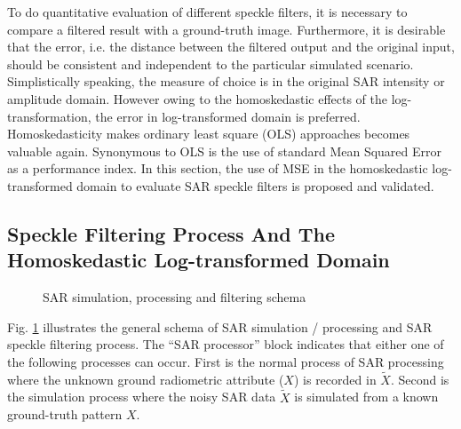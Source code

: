 To do quantitative evaluation of different speckle filters, it is necessary to compare a filtered result with a ground-truth image. 
Furthermore, it is desirable that the error, i.e. the distance between the filtered output and the original input, should be consistent and independent to the particular simulated scenario. 
Simplistically speaking, the measure of choice is in the original SAR intensity or amplitude domain. 
However owing to the homoskedastic effects of the log-transformation, the error in log-transformed domain is preferred.
Homoskedasticity makes ordinary least square (OLS) approaches becomes valuable again. 
Synonymous to OLS is the use of standard Mean Squared Error as a performance index.
In this section, the use of MSE in the homoskedastic log-transformed domain to evaluate SAR speckle filters is proposed and validated.


\subsection{ Speckle Filtering Process And The Homoskedastic Log-transformed Domain}
\label{sec:schema_log_images}

\begin{figure}[h]
 \centering
 \epsfxsize=2.4in
 \epsfysize=1.2in
\caption{SAR simulation, processing and filtering schema}
\label{fig:simul_process_filter_schema}
\end{figure}

Fig. \ref{fig:simul_process_filter_schema} illustrates the general schema of SAR simulation / processing and 
SAR speckle filtering process.
The ``SAR processor'' block indicates that either one of the following processes can occur.
First is the normal process of SAR processing where the unknown ground radiometric attribute ($X$) is recorded 
in $\tilde{X}$. Second is the simulation process where the noisy SAR data $\tilde{X}$ is simulated from a known 
ground-truth pattern $X$.

